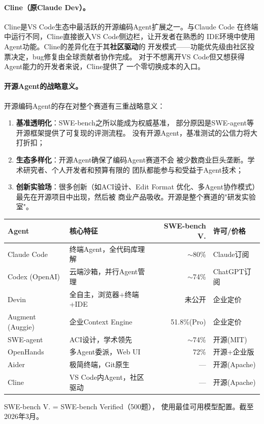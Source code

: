\paragraph{Cline（原Claude Dev）。}
Cline是VS Code生态中最活跃的开源编码Agent扩展之一。与Claude Code
在终端中运行不同，Cline直接嵌入VS Code侧边栏，让开发者在熟悉的
IDE环境中使用Agent功能。Cline的差异化在于其\textbf{社区驱动}的
开发模式——功能优先级由社区投票决定，bug修复由全球贡献者协作完成。
对于不想离开VS Code但又想获得Agent能力的开发者来说，Cline提供了
一个零切换成本的入口。

\paragraph{开源Agent的战略意义。}
开源编码Agent的存在对整个赛道有三重战略意义：
\begin{enumerate}
  \item \textbf{基准透明化}：SWE-bench之所以能成为权威基准，
    部分原因是SWE-agent等开源框架提供了可复现的评测流程。
    没有开源Agent，基准测试的公信力将大打折扣；
  \item \textbf{生态多样化}：开源Agent确保了编码Agent赛道不会
    被少数商业巨头垄断。学术研究者、个人开发者和预算有限的
    团队都能参与和受益于Agent技术；
  \item \textbf{创新实验场}：很多创新（如ACI设计、Edit Format
    优化、多Agent协作模式）最先在开源项目中出现，然后被
    商业产品吸收。开源是整个赛道的"研发实验室"。
\end{enumerate}

\begin{keybox}[AI 编码Agent全景对比]
\small
\begin{tabularx}{\textwidth}{l X r l}
\toprule
\rowcolor{figLightGray}
\textbf{Agent} & \textbf{核心特征} & \textbf{SWE-bench V.}
  & \textbf{许可/价格} \\
\midrule
Claude Code     & 终端Agent，全代码库理解     & $\sim$80\%     & Claude订阅 \\
Codex (OpenAI)  & 云端沙箱，并行Agent管理    & $\sim$74\%     & ChatGPT订阅 \\
Devin           & 全自主，浏览器+终端+IDE    & 未公开          & 企业定价 \\
Augment (Auggie)& 企业Context Engine         & 51.8\%(Pro)    & 企业定价 \\
SWE-agent       & ACI设计，学术领先          & $\sim$74\%     & 开源(MIT) \\
OpenHands       & 多Agent委派，Web UI        & 72\%           & 开源+企业版 \\
Aider           & 极简终端，Git原生           & ---            & 开源(Apache) \\
Cline           & VS Code内Agent，社区驱动   & ---            & 开源(Apache) \\
\bottomrule
\end{tabularx}

\medskip
\noindent SWE-bench V. = SWE-bench Verified（500题），
使用最佳可用模型配置。截至2026年3月。
\end{keybox}

